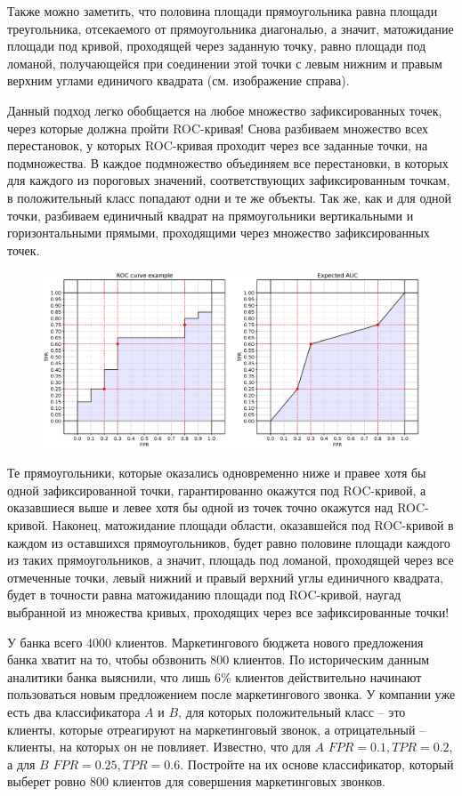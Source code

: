 \documentclass[12pt,a4paper]{article}
\begin{document}
Также можно заметить, что половина площади прямоугольника равна площади треугольника, отсекаемого от прямоугольника диагональю, а значит, матожидание площади под кривой, проходящей через заданную точку, равно площади под ломаной, получающейся при соединении этой точки с левым нижним и правым верхним углами единичого квадрата (см. изображение справа).

Данный подход легко обобщается на любое множество зафиксированных точек, через которые должна пройти ROC-кривая! Снова разбиваем множество всех перестановок, у которых ROC-кривая проходит через все заданные точки, на подмножества. В каждое подмножество объединяем все перестановки, в которых для каждого из пороговых значений, соответствующих зафиксированным точкам, в положительный класс попадают одни и те же объекты. Так же, как и для одной точки, разбиваем единичный квадрат на прямоугольники вертикальными и горизонтальными прямыми, проходящими через множество зафиксированных точек. 

\begin{figure}[h]
\centering
\includegraphics[width=\textwidth]{./img/pic3.eps}
\end{figure}

Те прямоугольники, которые оказались одновременно ниже и правее хотя бы одной зафиксированной точки, гарантированно окажутся под ROC-кривой, а оказавшиеся выше и левее хотя бы одной из точек точно окажутся над ROC-кривой. Наконец, матожидание площади области, оказавшейся под ROC-кривой в каждом из оставшихся прямоугольников, будет равно половине площади каждого из таких прямоугольников, а значит, площадь под ломаной, проходящей через все отмеченные точки, левый нижний и правый верхний углы единичного квадрата, будет в точности равна матожиданию площади под ROC-кривой, наугад выбранной из множества кривых, проходящих через все зафиксированные точки!

\begin{vkProblem} \label{task:economics}
У банка всего 4000 клиентов.
Маркетингового бюджета нового предложения банка хватит на то, чтобы обзвонить 800 клиентов.
По историческим данным аналитики банка выяснили, что лишь 6\% клиентов действительно начинают пользоваться новым предложением после маркетингового звонка.
У компании уже есть два классификатора $A$ и $B$, для которых положительный класс -- это клиенты, которые отреагируют на маркетинговый звонок, а отрицательный -- клиенты, на которых он не повлияет.
Известно, что для $A$ $FPR = 0.1, TPR = 0.2$, а для $B$ $FPR = 0.25, TPR = 0.6.$
Постройте на их основе классификатор, который выберет ровно 800 клиентов для совершения маркетинговых звонков.
\end{vkProblem}
\end{document}
